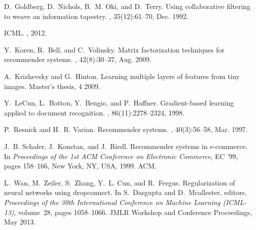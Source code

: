 \begin{thebibliography}{99}

D.~Goldberg, D.~Nichols, B.~M. Oki, and D.~Terry.
\newblock Using collaborative filtering to weave an information tapestry.
, 35(12):61--70, Dec. 1992.

ICML.
, 2012.

Y.~Koren, R.~Bell, and C.~Volinsky.
\newblock Matrix factorization techniques for recommender systems.
, 42(8):30--37, Aug. 2009.

A.~Krizhevsky and G.~Hinton.
\newblock Learning multiple layers of features from tiny images.
\newblock Master's thesis, 4 2009.

Y.~LeCun, L.~Bottou, Y.~Bengio, and P.~Haffner.
\newblock Gradient-based learning applied to document recognition.
, 86(11):2278--2324, 1998.

P.~Resnick and H.~R. Varian.
\newblock Recommender systems.
, 40(3):56--58, Mar. 1997.

J.~B. Schafer, J.~Konstan, and J.~Riedl.
\newblock Recommender systems in e-commerce.
\newblock In {\em Proceedings of the 1st ACM Conference on Electronic
  Commerce}, EC '99, pages 158--166, New York, NY, USA, 1999. ACM.

L.~Wan, M.~Zeiler, S.~Zhang, Y.~L. Cun, and R.~Fergus.
\newblock Regularization of neural networks using dropconnect.
\newblock In S.~Dasgupta and D.~Mcallester, editors, {\em Proceedings of the
  30th International Conference on Machine Learning (ICML-13)}, volume~28,
  pages 1058--1066. JMLR Workshop and Conference Proceedings, May 2013.


\end{thebibliography}